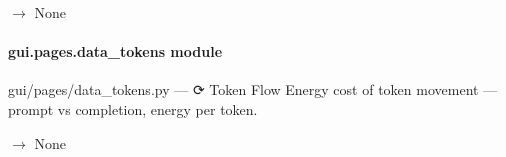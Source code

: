 \documentclass[letterpaper,10pt,english]{sphinxmanual}
\begin{document}
\begin{fulllineitems}
\label{\detokenize{gui.pages.data_swap:gui.pages.data_swap.render}}
\pysigstartsignatures
\pysiglinewithargsret
{}
{}
{{ $\rightarrow$ None}}
\pysigstopsignatures
\end{fulllineitems}


\sphinxstepscope


\paragraph{gui.pages.data\_tokens module}
\label{\detokenize{gui.pages.data_tokens:module-gui.pages.data_tokens}}\label{\detokenize{gui.pages.data_tokens:gui-pages-data-tokens-module}}\label{\detokenize{gui.pages.data_tokens::doc}}
\sphinxAtStartPar
gui/pages/data\_tokens.py  —  ⟳  Token Flow
Energy cost of token movement — prompt vs completion, energy per token.

\begin{fulllineitems}
\label{\detokenize{gui.pages.data_tokens:gui.pages.data_tokens.render}}
\pysigstartsignatures
\pysiglinewithargsret
{}
{}
{{ $\rightarrow$ None}}
\pysigstopsignatures
\end{fulllineitems}


\sphinxstepscope
\end{document}
